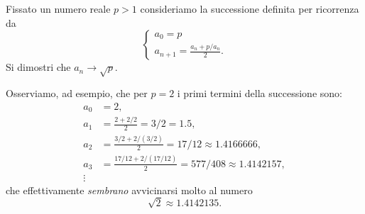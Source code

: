 \begin{example}\label{ex_Erone}
%
%
%
%
  Fissato un numero reale $p>1$ consideriamo la successione definita
  per
ricorrenza da
\[
\begin{cases}
  a_0 = p\\
  a_{n+1} = \frac{a_n + p/a_n}{2}.
\end{cases}
\]
Si dimostri che $a_n \to \sqrt p$.
\end{example}
Osserviamo, ad esempio, che per $p=2$ i
primi termini della successione sono:
\begin{align*}
a_0 &= 2, \\
a_1 &= \frac{2+2/2}{2} = 3/2 = 1.5, \\
a_2 &= \frac{3/2 + 2/(3/2)}{2} = 17/12 \approx 1.4166666, \\
a_3 &= \frac{17/12 + 2/(17/12)}{2} = 577 / 408 \approx 1.4142157,\\
\vdots
\end{align*}
che effettivamente \emph{sembrano} avvicinarsi molto al numero
\[
\sqrt 2\approx 1.4142135.
\]

